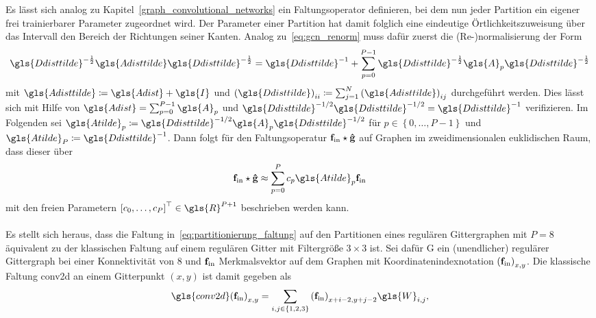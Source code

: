 Es lässt sich analog zu Kapitel~\ref{graph_convolutional_networks} ein Faltungsoperator definieren, bei dem nun jeder Partition ein eigener frei trainierbarer Parameter zugeordnet wird.
Der Parameter einer Partition hat damit folglich eine eindeutige Örtlichkeitszuweisung über das Intervall \bzw{} den Bereich der Richtungen seiner Kanten.
Analog zu~\eqref{eq:gcn_renorm} muss dafür zuerst die (Re-)normalisierung der Form
\begin{equation*}
  \gls{Ddisttilde}^{-\frac{1}{2}}\gls{Adisttilde}\gls{Ddisttilde}^{-\frac{1}{2}} = \gls{Ddisttilde}^{-1} + \sum_{p=0}^{P-1} \gls{Ddisttilde}^{-\frac{1}{2}}\gls{A}_p\gls{Ddisttilde}^{-\frac{1}{2}}
\end{equation*}
mit $\gls{Adisttilde} \coloneqq \gls{Adist} + \gls{I}$ und ${\left(\gls{Ddisttilde}\right)}_{ii} \coloneqq \sum_{j=1}^N {\left(\gls{Adisttilde}\right)}_{ij}$ durchgeführt werden.
Dies lässt sich mit Hilfe von $\gls{Adist} = \sum_{p=0}^{P-1} \gls{A}_p$ und $\gls{Ddisttilde}^{-1/2}\gls{Ddisttilde}^{-1/2} = \gls{Ddisttilde}^{-1}$ verifizieren.
Im Folgenden sei $\gls{Atilde}_p \coloneqq \gls{Ddisttilde}^{-1/2}\gls{A}_p\gls{Ddisttilde}^{-1/2}$ für $p \in \left\{0, \ldots, P-1 \right\}$ und $\gls{Atilde}_P \coloneqq \gls{Ddisttilde}^{-1}$.
Dann folgt für den Faltungsoperatur $\mathbf{f}_{\mathrm{in}} \star \mathbf{\hat g}$ auf Graphen im zweidimensionalen euklidischen Raum, dass dieser über
\begin{equation}
  \ve{f}_{\mathrm{in}} \star \ve{\hat g} \approx \sum_{p=0}^P c_p \gls{Atilde}_p \ve{f}_{\mathrm{in}}
  \label{eq:partitionierung_faltung}
\end{equation}
mit den freien Parametern ${\left[c_0, \ldots, c_P\right]}^{\top} \in \gls{R}^{P+1}$ beschrieben werden kann.
\\\\
Es stellt sich heraus, dass die Faltung in~\eqref{eq:partitionierung_faltung} auf den Partitionen eines regulären Gittergraphen mit $P=8$ äquivalent zu der klassischen Faltung auf einem regulären Gitter mit Filtergröße $3 \times 3$ ist.
Sei dafür \gls{G} ein (unendlicher) regulärer Gittergraph bei einer Konnektivität von $8$ und $\mathbf{f}_{\mathrm{in}}$ Merkmalsvektor auf dem Graphen mit Koordinatenindexnotation ${\left(\ve{f}_{\mathrm{in}}\right)}_{x,y}$.
  Die klassische Faltung \gls{conv2d} an einem Gitterpunkt $\left(x, y\right)$ ist damit gegeben als
\begin{equation*}
  {\gls{conv2d}\left({\ve{f}_{\mathrm{in}}}\right)}_{x,y} = \sum_{i,j \in \left\{1, 2, 3\right\}} {\left(\ve{f}_{\mathrm{in}}\right)}_{x+i-2, y+j-2} \gls{W}_{i, j},
\end{equation*}
